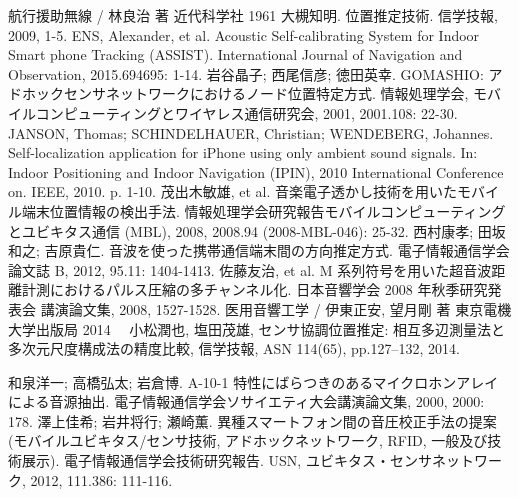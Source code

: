 \begin{thebibliography}{99}
 航行援助無線 / 林良治 著 近代科学社 1961
 大槻知明. 位置推定技術. 信学技報, 2009, 1-5.
 ENS, Alexander, et al. Acoustic Self-calibrating System for Indoor Smart phone Tracking (ASSIST). International Journal of Navigation and Observation, 2015.694695: 1-14.
 岩谷晶子; 西尾信彦; 徳田英幸. GOMASHIO: アドホックセンサネットワークにおけるノード位置特定方式. 情報処理学会, モバイルコンピューティングとワイヤレス通信研究会, 2001, 2001.108: 22-30.
 JANSON, Thomas; SCHINDELHAUER, Christian; WENDEBERG, Johannes. Self-localization application for iPhone using only ambient sound signals. In: Indoor Positioning and Indoor Navigation (IPIN), 2010 International Conference on. IEEE, 2010. p. 1-10.
 茂出木敏雄, et al. 音楽電子透かし技術を用いたモバイル端末位置情報の検出手法. 情報処理学会研究報告モバイルコンピューティングとユビキタス通信 (MBL), 2008, 2008.94 (2008-MBL-046): 25-32.
 西村康孝; 田坂和之; 吉原貴仁. 音波を使った携帯通信端末間の方向推定方式. 電子情報通信学会論文誌 B, 2012, 95.11: 1404-1413.
 佐藤友治, et al. M 系列符号を用いた超音波距離計測におけるパルス圧縮の多チャンネル化. 日本音響学会 2008 年秋季研究発表会 講演論文集, 2008, 1527-1528.
 医用音響工学 / 伊東正安, 望月剛 著 東京電機大学出版局 2014
　小松潤也, 塩田茂雄, センサ協調位置推定: 相互多辺測量法と多次元尺度構成法の精度比較, 信学技報, ASN 114(65), pp.127--132, 2014.



 和泉洋一; 高橋弘太; 岩倉博. A-10-1 特性にばらつきのあるマイクロホンアレイによる音源抽出. 電子情報通信学会ソサイエティ大会講演論文集, 2000, 2000: 178.
 澤上佳希; 岩井将行; 瀬崎薫. 異種スマートフォン間の音圧校正手法の提案 (モバイルユビキタス/センサ技術, アドホックネットワーク, RFID, 一般及び技術展示). 電子情報通信学会技術研究報告. USN, ユビキタス・センサネットワーク, 2012, 111.386: 111-116.


\end{thebibliography}
